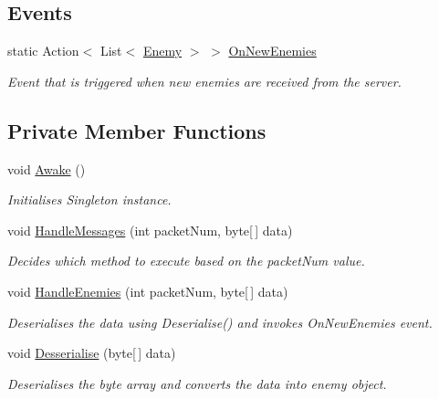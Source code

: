 \subsection*{Events}
\begin{DoxyCompactItemize}
\item 
static Action$<$ List$<$ \mbox{\hyperlink{class_enemy}{Enemy}} $>$ $>$ \mbox{\hyperlink{class_client_handle_data_ab147321855bab2a2d26b681d4f62869e}{On\+New\+Enemies}}
\begin{DoxyCompactList}\small\item\em Event that is triggered when new enemies are received from the server. \end{DoxyCompactList}\end{DoxyCompactItemize}
\subsection*{Private Member Functions}
\begin{DoxyCompactItemize}
\item 
void \mbox{\hyperlink{class_client_handle_data_aa64ba3f18a724bd131ac488e2fa0e744}{Awake}} ()
\begin{DoxyCompactList}\small\item\em Initialises Singleton instance. \end{DoxyCompactList}\item 
void \mbox{\hyperlink{class_client_handle_data_a2b973713df73e2e1bd53c70557fdcd34}{Handle\+Messages}} (int packet\+Num, byte\mbox{[}$\,$\mbox{]} data)
\begin{DoxyCompactList}\small\item\em Decides which method to execute based on the packet\+Num value. \end{DoxyCompactList}\item 
void \mbox{\hyperlink{class_client_handle_data_a82bf56e38f140f42f31cc54b77e6719a}{Handle\+Enemies}} (int packet\+Num, byte\mbox{[}$\,$\mbox{]} data)
\begin{DoxyCompactList}\small\item\em Deserialises the data using Deserialise() and invokes On\+New\+Enemies event. \end{DoxyCompactList}\item 
void \mbox{\hyperlink{class_client_handle_data_a1c02a29592a27b304e7f465dada3f92f}{Desserialise}} (byte\mbox{[}$\,$\mbox{]} data)
\begin{DoxyCompactList}\small\item\em Deserialises the byte array and converts the data into enemy object. \end{DoxyCompactList}\end{DoxyCompactItemize}


